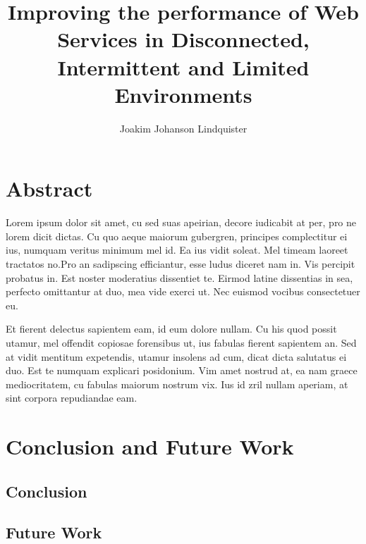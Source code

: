 \documentclass[USenglish]{ifimaster}
\title{Improving the performance of Web Services in Disconnected, Intermittent
and Limited Environments}
\author{Joakim Johanson Lindquister}
\begin{document}
\ififorside{}

\chapter*{Abstract}

Lorem ipsum dolor sit amet, cu sed suas apeirian, decore iudicabit at per, pro
ne lorem dicit dictas. Cu quo aeque maiorum gubergren, principes complectitur ei
ius, numquam veritus minimum mel id. Ea ius vidit soleat. Mel timeam laoreet
tractatos no.Pro an sadipscing efficiantur, esse ludus diceret nam in. Vis
percipit probatus in. Est noster moderatius dissentiet te. Eirmod latine
dissentias in sea, perfecto omittantur at duo, mea vide exerci ut. Nec euismod
vocibus consectetuer eu.

Et fierent delectus sapientem eam, id eum dolore nullam. Cu his quod possit
utamur, mel offendit copiosae forensibus ut, ius fabulas fierent sapientem an.
Sed at vidit mentitum expetendis, utamur insolens ad cum, dicat dicta salutatus
ei duo. Est te numquam explicari posidonium. Vim amet nostrud at, ea nam graece
mediocritatem, cu fabulas maiorum nostrum vix. Ius id zril nullam aperiam, at
sint corpora repudiandae eam.

\tableofcontents
\listoftables
\listoffigures

\pagebreak








\chapter{Conclusion and Future Work}
\section{Conclusion}

\section{Future Work}

\pagebreak
\printbibliography{}
\printglossaries{}
\end{document}
